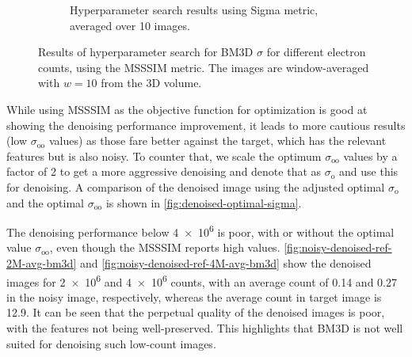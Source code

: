 \begin{figure}
\begin{subfigure}[t]{0.49\linewidth}
        \caption{Hyperparameter search results using Sigma metric, averaged over 10 images.}
        \label{fig:hyperparameter-sigma-averaged-10-images}
    \end{subfigure}
    \caption{Results of hyperparameter search for \gls{BM3D} $\sigma$ for different electron counts, using the \gls{MSSSIM} metric. The images are window-averaged with $w=10$ from the 3D volume.}
    \label{fig:hyperparameter-averaged-10-images}
\end{figure}

While using \gls{MSSSIM} as the objective function for optimization is good at showing the denoising performance improvement, it leads to more cautious results (low $\sigma_{\text{oo}}$ values) as those fare better against the target, which has the relevant features but is also noisy. To counter that, we scale the optimum $\sigma_{\text{oo}}$ values by a factor of 2 to get a more aggressive denoising and denote that as $\sigma_{\text{o}}$ and use this for denoising. A comparison of the denoised image using the adjusted optimal $\sigma_{\text{o}}$ and the optimal $\sigma_{\text{oo}}$ is shown in \cref{fig:denoised-optimal-sigma}.

The denoising performance below \num{4e6}  is poor, with or without the optimal value $\sigma_{\text{oo}}$, even though the \gls{MSSSIM} reports high values. \cref{fig:noisy-denoised-ref-2M-avg-bm3d} and \cref{fig:noisy-denoised-ref-4M-avg-bm3d} show the denoised images for \num{2e6} and \num{4e6} counts, with an average count of \num{0.14} and \num{0.27}  in the noisy image, respectively, whereas the average count in target image is \num{12.9}. It can be seen that the perpetual  quality of the denoised images is poor, with the features not being well-preserved. This highlights that \gls{BM3D} is not well suited for denoising such low-count images.

